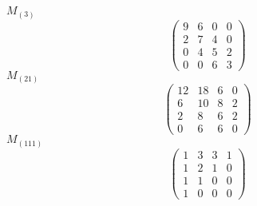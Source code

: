 \documentclass[12pt,reqno]{amsart}
\begin{document}
\Large
$M_{(3)}$                             $$ \begin{pmatrix} 
                           9 & 6 & 0 & 0 \\[6pt]
                           2 & 7 & 4 & 0 \\[6pt]
                           0 & 4 & 5 & 2 \\[6pt]
                             0 & 0 & 6 & 3
                              \end{pmatrix} $$ 
$M_{(21)}$                             $$ \begin{pmatrix} 
                          12 & 18 & 6 & 0 \\[6pt]
                          6 & 10 & 8 & 2 \\[6pt]
                           2 & 8 & 6 & 2 \\[6pt]
                             0 & 6 & 6 & 0
                              \end{pmatrix} $$ 
$M_{(111)}$                             $$ \begin{pmatrix} 
                           1 & 3 & 3 & 1 \\[6pt]
                           1 & 2 & 1 & 0 \\[6pt]
                           1 & 1 & 0 & 0 \\[6pt]
                             1 & 0 & 0 & 0
                              \end{pmatrix} $$ 
\end{document}
